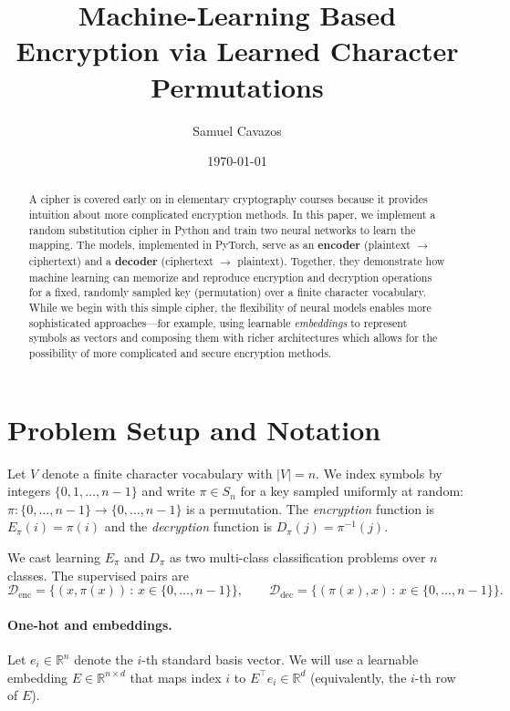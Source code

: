\documentclass[12pt]{article}
\title{Machine-Learning Based Encryption via Learned Character Permutations}
\author{Samuel Cavazos}
\date{\today}
\begin{document}
\maketitle

\begin{abstract}
A cipher is covered early on in elementary cryptography courses because it provides intuition about more complicated encryption methods. In this paper, we implement a random substitution cipher in Python and train two neural networks to learn the mapping. The models, implemented in PyTorch, serve as an \textbf{encoder} (plaintext $\rightarrow$ ciphertext) and a \textbf{decoder} (ciphertext $\rightarrow$ plaintext). Together, they demonstrate how machine learning can memorize and reproduce encryption and decryption operations for a fixed, randomly sampled key (permutation) over a finite character vocabulary. While we begin with this simple cipher, the flexibility of neural models enables more sophisticated approaches—for example, using learnable \emph{embeddings} to represent symbols as vectors and composing them with richer architectures which allows for the possibility of more complicated and secure encryption methods.
\end{abstract}

\section{Problem Setup and Notation}
Let $V$ denote a finite character vocabulary with $|V|=n$. We index symbols by integers $\{0,1,\dots,n-1\}$ and write $\pi\in S_n$ for a key sampled uniformly at random: $\pi:\{0,\dots,n-1\}\!\to\!\{0,\dots,n-1\}$ is a permutation. The \emph{encryption} function is $E_\pi(i)=\pi(i)$ and the \emph{decryption} function is $D_\pi(j)=\pi^{-1}(j)$.

We cast learning $E_\pi$ and $D_\pi$ as two multi-class classification problems over $n$ classes. The supervised pairs are
\[
\mathcal{D}_{\mathrm{enc}}=\{(x,\pi(x))\,:\,x\in\{0,\dots,n-1\}\},\qquad
\mathcal{D}_{\mathrm{dec}}=\{(\pi(x),x)\,:\,x\in\{0,\dots,n-1\}\}.
\]

\paragraph{One-hot and embeddings.}
Let $e_i\in\mathbb{R}^n$ denote the $i$-th standard basis vector. We will use a learnable embedding $E\in\mathbb{R}^{n\times d}$ that maps index $i$ to $E^\top e_i\in\mathbb{R}^d$ (equivalently, the $i$-th row of $E$).
\end{document}
